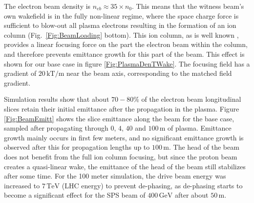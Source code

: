 \documentclass[aps,prstab,reprint,amsmath,amssymb,groupedaddress,onecolumn]{revtex4-1}
\newcommand{\unit}[1]{\,\mathrm{#1}}
\begin{document}
The %
electron beam density is $n_{eb} \approx 35\times n_{0}$.  This means that the witness beam's own wakefield
is in the fully non-linear regime, where the space charge force is sufficient to blow-out all plasma electrons resulting
in the formation of an ion column %
(Fig.~\ref{Fig:BeamLoading} bottom). This ion column, as is well known \cite{rosenzweig:1991}, provides a linear focusing
force on the part the electron beam within the column, and therefore prevents emittance growth for this %
part of the
beam.  This effect is shown for our base case in figure \ref{Fig:PlasmaDenTWake}.  The focusing field has a gradient of
$20\unit{kT/m}$ near the beam axis, corresponding to the matched field gradient.



 Simulation results show that about $70-80\%$ of the electron beam longitudinal slices retain their initial emittance after the propagation in the plasma.  Figure \ref{Fig:BeamEmitt} shows the slice emittance along the beam for the base case, sampled after propagating through $0$, $4$, $40$ and $100\unit{m}$ of plasma. 
Emittance growth mainly occurs in first few meters, and no significant emittance growth %
is observed after this for propagation lengths up to
$100\unit{m}$.  The head of the beam does not benefit from the full ion column focusing, but since the proton beam creates a quasi-linear wake, the emittance of the head of the beam still stabilizes after some time.  For the 100 meter simulation, the drive beam energy was increased to $7\unit{TeV}$ (LHC energy) to prevent de-phasing,
as de-phasing starts to become a significant effect for the SPS beam of $400\unit{GeV}$ after about $50\unit{m}$.
\end{document}
